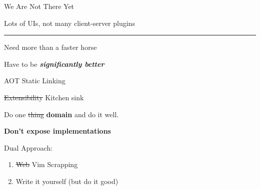 \documentclass{beamer}
\begin{document}
\begin{frame}{We Are Not There Yet}

	Lots of UIs, not many client-server plugins

	\rule{\textwidth}{0.1em}

	Need more than a faster horse

	\hspace{0.1em}

	Have to be \textbf{\textit{significantly better}}

\end{frame}


\begin{frame}{AOT Static Linking}

	\begin{block}{\st{Extensibility} Kitchen sink}

		\vspace{0.5em}

		Do one \st{thing} \textbf{domain} and do it well.

		\vspace{0.5em}

		\textbf{Don't expose implementations}

	\end{block}

	\hspace{0.1em}

	Dual Approach:

	\begin{enumerate}

		\item \st{Web} Vim Scrapping

		\item Write it yourself (but do it good)

	\end{enumerate}

\end{frame}
\end{document}
